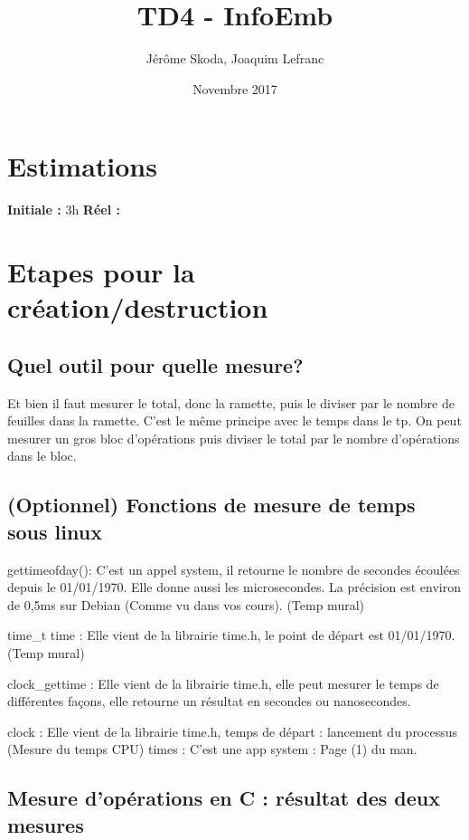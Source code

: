 \documentclass[12pt]{article}
\title{TD4 - InfoEmb}
\author{Jérôme Skoda, Joaquim Lefranc}
\date{Novembre 2017}
\begin{document}
\maketitle

\section{Estimations}
\textbf{Initiale :} 3h
\textbf{Réel :}

\section{Etapes pour la création/destruction}

	\subsection{Quel outil pour quelle mesure?}
		Et bien il faut mesurer le total, donc la ramette, puis le diviser par le nombre de feuilles dans la ramette. C'est le même principe avec le temps dans le tp. On peut mesurer un gros bloc d'opérations puis diviser le total par le nombre d'opérations dans le bloc.

	\subsection{(Optionnel) Fonctions de mesure de temps sous linux}

	gettimeofday(): C'est un appel system, il retourne le nombre de secondes écoulées depuis le 01/01/1970. Elle donne aussi les microsecondes. La précision est environ de 0,5ms sur Debian (Comme vu dans vos cours). (Temp mural)
	\newline

	time\_t time : Elle vient de la librairie time.h, le point de départ est 01/01/1970. (Temp mural)
	\newline

	clock\_gettime : Elle vient de la librairie time.h, elle peut mesurer le temps de différentes façons, elle retourne un résultat en secondes ou nanosecondes.
	\newline

	clock : Elle vient de la librairie time.h, temps de départ : lancement du processus (Mesure du temps CPU)
	\newline
	times : C'est une app system : Page (1) du man.
	\newline


	\subsection{Mesure d'opérations en C : résultat des deux mesures}
\end{document}
